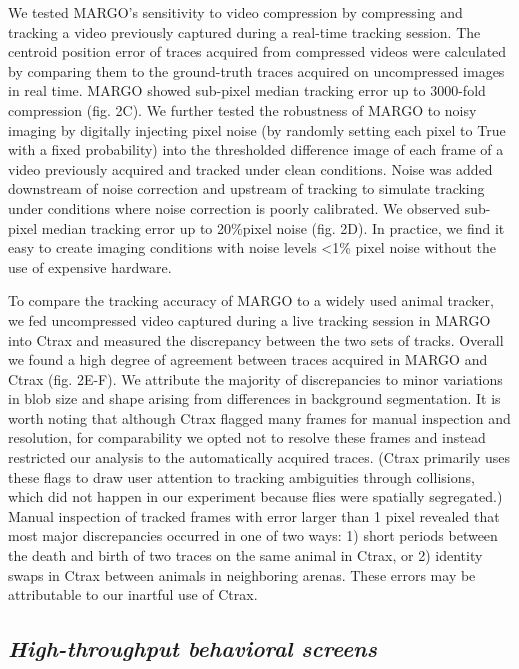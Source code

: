 \documentclass[12pt,letterpaper]{article}
\begin{document}
We tested MARGO's sensitivity to video compression by compressing and tracking a video previously captured during a real-time tracking session. The centroid position error of traces acquired from compressed videos were calculated by comparing them to the ground-truth traces acquired on uncompressed images in real time. MARGO showed sub-pixel median tracking error up to 3000-fold compression (fig. 2C). We further tested the robustness of MARGO to noisy imaging by digitally injecting pixel noise (by randomly setting each pixel to True with a fixed probability) into the thresholded difference image of each frame of a video previously acquired and tracked under clean conditions. Noise was added downstream of noise correction and upstream of tracking to simulate tracking under conditions where noise correction is poorly calibrated. We observed sub-pixel median tracking error up to 20\%pixel noise (fig. 2D). In practice, we find it easy to create imaging conditions with noise levels <1\% pixel noise without the use of expensive hardware.

To compare the tracking accuracy of MARGO to a widely used animal tracker, we fed uncompressed video captured during a live tracking session in MARGO into Ctrax \cite{Branson_High_2009} and measured the discrepancy between the two sets of tracks. Overall we found a high degree of agreement between traces acquired in MARGO and Ctrax (fig. 2E-F). We attribute the majority of discrepancies to minor variations in blob size and shape arising from differences in background segmentation. It is worth noting that although Ctrax flagged many frames for manual inspection and resolution, for comparability we opted not to resolve these frames and instead restricted our analysis to the automatically acquired traces. (Ctrax primarily uses these flags to draw user attention to tracking ambiguities through collisions, which did not happen in our experiment because flies were spatially segregated.) Manual inspection of tracked frames with error larger than 1 pixel revealed that most major discrepancies occurred in one of two ways: 1) short periods between the death and birth of two traces on the same animal in Ctrax, or 2) identity swaps in Ctrax between animals in neighboring arenas. These errors may be attributable to our inartful use of Ctrax.

\subsection*{\textit{High-throughput behavioral screens}}
\end{document}
